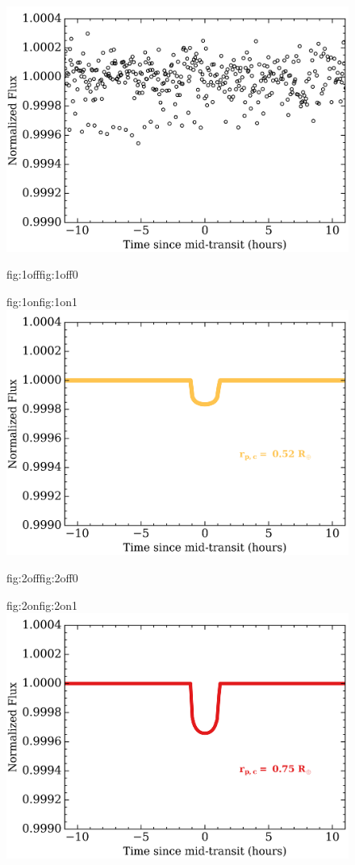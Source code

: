 \begin{figure}
  \centering
  \includegraphics[width=0.8\hsize]{figures/transits_bkgd.png}%
   \hspace{-0.8\hsize}%
  \begin{ocg}{fig:1off}{fig:1off}{0}%
  \end{ocg}%
  \begin{ocg}{fig:1on}{fig:1on}{1}%
    \includegraphics[width=0.8\hsize]{figures/transits_1.png}%
  \end{ocg}
  \hspace{-0.8\hsize}%
  \begin{ocg}{fig:2off}{fig:2off}{0}%
  \end{ocg}%
  \begin{ocg}{fig:2on}{fig:2on}{1}%
    \includegraphics[width=0.8\hsize]{figures/transits_2.png}%

\end{ocg}
\end{figure}
